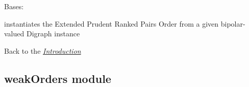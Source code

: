 \documentclass[letterpaper,10pt,english]{sphinxmanual}
\begin{document}

\begin{fulllineitems}
\label{techDoc:linearOrders.RankedPairsOrder}
Bases: {\hyperref[techDoc:linearOrders.LinearOrder]{}}

instantiates the Extended Prudent Ranked Pairs Order from
a given bipolar-valued Digraph instance

\end{fulllineitems}


Back to the {\hyperref[techDoc:introduction-label]{\emph{Introduction}}}


\subsection{weakOrders module}
\label{techDoc:weakorders-label}\label{techDoc:weakorders-module}\label{techDoc:module-weakOrders}
\end{document}
